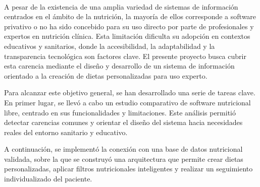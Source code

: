 \chapter*{}


%



\cleardoublepage
\thispagestyle{empty}

\begin{center}
{\large\bfseries \myTitle}\\
\end{center}
\begin{center}
\myName\\
\end{center}

\\

\vspace{0.7cm}
\\

A pesar de la existencia de una amplia variedad de sistemas de información centrados en el ámbito de la nutrición, la mayoría de ellos corresponde a software privativo o no ha sido concebido para su uso directo por parte de profesionales y expertos en nutrición clínica. Esta limitación dificulta su adopción en contextos educativos y sanitarios, donde la accesibilidad, la adaptabilidad y la transparencia tecnológica son factores clave. El presente proyecto busca cubrir esta carencia mediante el diseño y desarrollo de un sistema de información orientado a la creación de dietas personalizadas para uso experto.

Para alcanzar este objetivo general, se han desarrollado una serie de tareas clave. En primer lugar, se llevó a cabo un estudio comparativo de software nutricional libre, centrado en sus funcionalidades y limitaciones. Este análisis permitió detectar carencias comunes y orientar el diseño del sistema hacia necesidades reales del entorno sanitario y educativo.

A continuación, se implementó la conexión con una base de datos nutricional validada, sobre la que se construyó una arquitectura que permite crear dietas personalizadas, aplicar filtros nutricionales inteligentes y realizar un seguimiento individualizado del paciente.

